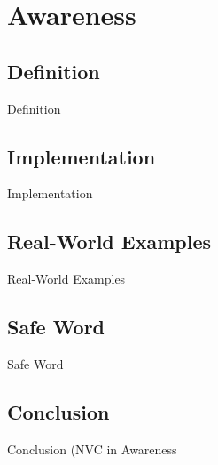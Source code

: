 %
%

\pagebreak
\section{Awareness}

\onehalfspacing

\subsection{Definition}

Definition

\subsection{Implementation}

Implementation

\subsection{Real-World Examples}

Real-World Examples

\subsection{Safe Word}

Safe Word

\subsection{Conclusion}

Conclusion (NVC in Awareness
